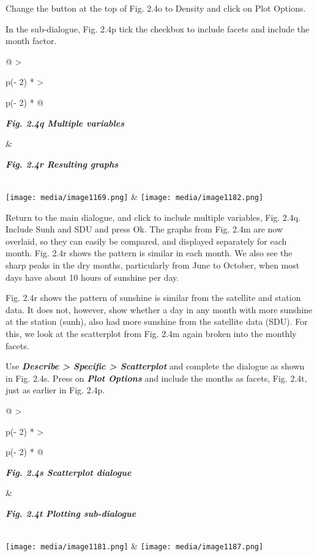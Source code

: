 \documentclass[
  letterpaper,
  DIV=11,
  numbers=noendperiod]{scrreprt}
\begin{document}
Change the button at the top of Fig. 2.4o to Density and click on Plot
Options.

In the sub-dialogue, Fig. 2.4p tick the checkbox to include facets and
include the month factor.

\begin{longtable}[]{@{}
  >{\raggedright\arraybackslash}p{(\columnwidth - 2\tabcolsep) * }
  >{\raggedright\arraybackslash}p{(\columnwidth - 2\tabcolsep) * }@{}}
\toprule\noalign{}
\begin{minipage}[b]{\linewidth}\raggedright
\textbf{\emph{Fig. 2.4q Multiple variables}}
\end{minipage} & \begin{minipage}[b]{\linewidth}\raggedright
\textbf{\emph{Fig. 2.4r Resulting graphs}}
\end{minipage} \\
\midrule\noalign{}
\endhead
\bottomrule\noalign{}
\endlastfoot
\texttt{[image: media/image1169.png]}
&
\texttt{[image: media/image1182.png]} \\
\end{longtable}

Return to the main dialogue, and click to include multiple variables,
Fig. 2.4q. Include Sunh and SDU and press Ok. The graphs from Fig. 2.4m
are now overlaid, so they can easily be compared, and displayed
separately for each month. Fig. 2.4r shows the pattern is similar in
each month. We also see the sharp peaks in the dry months, particularly
from June to October, when most days have about 10 hours of sunshine per
day.

Fig. 2.4r shows the pattern of sunshine is similar from the satellite
and station data. It does not, however, show whether a day in any month
with more sunshine at the station (sunh), also had more sunshine from
the satellite data (SDU). For this, we look at the scatterplot from Fig.
2.4m again broken into the monthly facets.

Use \textbf{\emph{Describe \textgreater{} Specific \textgreater{}
Scatterplot}} and complete the dialogue as shown in Fig. 2.4s. Press on
\textbf{\emph{Plot Options}} and include the months as facets, Fig.
2.4t, just as earlier in Fig. 2.4p.

\begin{longtable}[]{@{}
  >{\raggedright\arraybackslash}p{(\columnwidth - 2\tabcolsep) * }
  >{\raggedright\arraybackslash}p{(\columnwidth - 2\tabcolsep) * }@{}}
\toprule\noalign{}
\begin{minipage}[b]{\linewidth}\raggedright
\textbf{\emph{Fig. 2.4s Scatterplot dialogue}}
\end{minipage} & \begin{minipage}[b]{\linewidth}\raggedright
\textbf{\emph{Fig. 2.4t Plotting sub-dialogue}}
\end{minipage} \\
\midrule\noalign{}
\endhead
\bottomrule\noalign{}
\endlastfoot
\texttt{[image: media/image1181.png]} &
\texttt{[image: media/image1187.png]} \\
\end{longtable}
\end{document}
